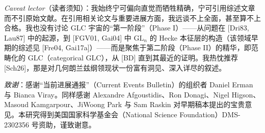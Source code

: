 \textit{Caveat lector}（读者须知）：我始终宁可偏向直觉而牺牲精确，宁可引用综述文章而不引原始文献。在引用相关论文与重要进展方面，我远谈不上全面，甚至算不上合格。我也没有讨论 GLC 宇宙的“第一阶段”（Phase I）——从问题在 [Dri83, Lau87] 中的起源，到 [FGV01, Gai04] 中 $\mathrm{GL}_{n}$ 的 Hecke 本征层的构造（该领域早期的综述见 [Fre04, Gai17a]）——而是聚焦于第二阶段（Phase II）的精华，即范畴化的 GLC（categorical GLC），从 [BD] 直到其最近的证明。我热忱推荐 [Sch26]，那是对几何朗兰兹纲领现状一份富有洞见、深入详尽的叙述。

\textit{致谢}：感谢“当前进展通报”（Current Events Bulletin）的组织者 Daniel Erman 与 Bianca Viray。同样感谢 Alexandre Afgoustidis、Ron Donagi、Nigel Higson、Masoud Kamgarpour、JiWoong Park 与 Sam Raskin 对早期稿本提出的宝贵意见。本研究得到美国国家科学基金会（National Science Foundation）DMS-2302356 号资助，谨致谢意。
